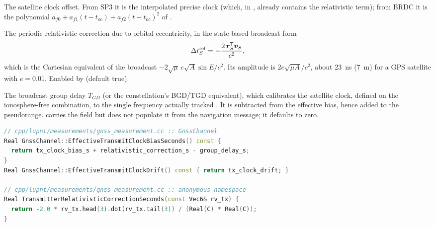 \begin{description}[leftmargin=1.4em,style=nextline,font=\normalfont\itshape]
  \item[$\Delta t_S$ --- \code{tx\_clock\_bias\_s}]
    The satellite clock offset. From SP3 it is the interpolated precise clock
    (which, in , already contains the relativistic term); from
    BRDC it is the polynomial $a_{f0} + a_{f1}(t-t_{oc}) + a_{f2}(t-t_{oc})^2$
    of \citet{icdgps200}.
  \item[$\Delta t_S^{\mathrm{rel}}$ --- \code{relativistic\_correction\_s}]
    The periodic relativistic correction due to orbital eccentricity, in the
    state-based broadcast form
    \begin{equation}
      \label{eq:gnss-relativity}
      \Delta t_S^{\mathrm{rel}}
      = -\frac{2\,\bm{r}_S^{\mathsf{T}}\bm{v}_S}{c^{2}} ,
    \end{equation}
    which is the Cartesian equivalent of the broadcast
    $-2\sqrt{\mu}\,e\sqrt{A}\sin E / c^2$. Its amplitude is
    $2 e \sqrt{\mu A}/c^2$, about \SI{23}{\nano\second} (\SI{7}{\meter}) for a
    GPS satellite with $e = 0.01$. Enabled by
     (default true).
  \item[$\Delta t_S^{\mathrm{grp}}$ --- \code{group\_delay\_s}]
    The broadcast group delay $T_{GD}$ (or the constellation's BGD/TGD
    equivalent), which calibrates the satellite clock, defined on the
    ionosphere-free combination, to the single frequency actually tracked
    \citep{icdgps200}. It is subtracted from the effective bias, hence added
    to the pseudorange. \lupnt{} carries the field but does not populate it
    from the navigation message; it defaults to zero.
\end{description}

\begin{lstlisting}[language=cpp, caption={Effective transmitter clock terms.},
label={lst:gnss-tx-clock}]
// cpp/lupnt/measurements/gnss_measurement.cc :: GnssChannel
Real GnssChannel::EffectiveTransmitClockBiasSeconds() const {
  return tx_clock_bias_s + relativistic_correction_s - group_delay_s;
}
Real GnssChannel::EffectiveTransmitClockDrift() const { return tx_clock_drift; }

// cpp/lupnt/measurements/gnss_measurement.cc :: anonymous namespace
Real TransmitterRelativisticCorrectionSeconds(const Vec6& rv_tx) {
  return -2.0 * rv_tx.head(3).dot(rv_tx.tail(3)) / (Real(C) * Real(C));
}
\end{lstlisting}

